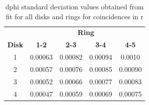 \begin{table}[H]
  \centering
  \caption[dphi cut values]{dphi standard deviation values obtained from fit for all disks and rings for coincidences in r}
\begin{tabular}{ccccc}
 & \multicolumn{4}{c}{\textbf{Ring}} \\
\textbf{Disk} & \textbf{1-2} & \textbf{2-3} & \textbf{3-4} & \textbf{4-5} \\
\hline
1 & 0.00063 & 0.00082 & 0.00094 & 0.0010 \\
2 & 0.00057 & 0.00076 & 0.00085 & 0.00090 \\
3 & 0.00052 & 0.00066 & 0.00077 & 0.00083 \\
4 & 0.00047 & 0.00059 & 0.00069 & 0.00075 \\
\end{tabular}
\label{tab:my_label_54}
\end{table}



